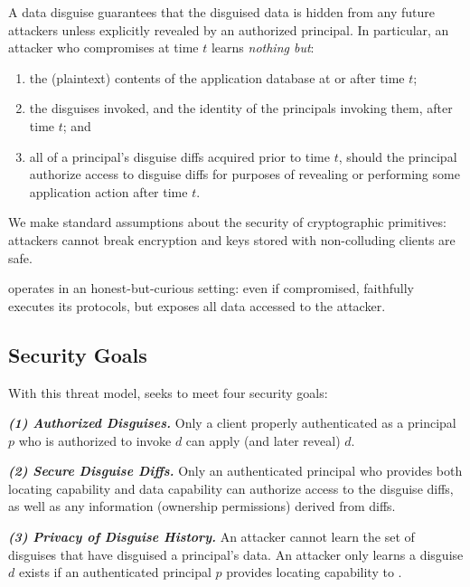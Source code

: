 %
A data disguise guarantees that the disguised data is hidden from any future attackers unless
explicitly revealed by an authorized principal.
%
In particular, an attacker who compromises \sys at time $t$ learns \emph{nothing but}:
\begin{enumerate}[nosep]
  \item the (plaintext) contents of the application database at or after time $t$;
  \item the disguises invoked, and the identity of the principals invoking them, after time $t$; and 
  \item all of a principal's disguise diffs acquired prior to time $t$, should the principal authorize access to
      disguise diffs for purposes of revealing or performing some application action after time $t$.
\end{enumerate}
%
We make standard assumptions about the security of cryptographic primitives: attackers cannot
break encryption and keys stored with non-colluding clients are safe.
%

%
\sys operates in an honest-but-curious setting: even if compromised, \sys faithfully executes
its protocols, but exposes all data accessed to the attacker.
%

\subsection{Security Goals}
%
With this threat model, \sys seeks to meet four security goals:
%

%
\vspace{6pt}\noindent\textbf{\emph{(1) Authorized Disguises.}}
%
Only a client properly authenticated as a principal $p$ who is authorized to invoke $d$ can apply
(and later reveal) $d$.
%

\vspace{6pt}\noindent\textbf{\emph{(2) Secure Disguise Diffs.}}
%
Only an authenticated principal who provides both locating capability  and data capability
 can authorize access to the disguise diffs, as well as any information
(\eg ownership permissions) derived from diffs.
%

\vspace{6pt}\noindent\textbf{\emph{(3) Privacy of Disguise History.}}
%
An attacker cannot learn the set of disguises that have disguised a principal's data.
%
An attacker only learns a disguise $d$ exists if an authenticated principal $p$ provides
locating capability  to \sys.

